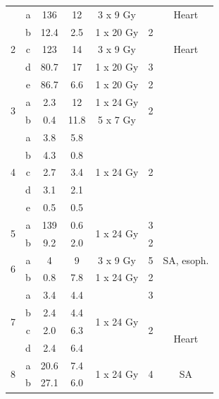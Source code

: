 \documentclass[type=dr, dr=rernat, accentcolor=tud7b,colorbacktitle, bigchapter, openright, twoside, 12pt ]{tudthesis}
\begin{document}
\begin{table}[H]
\begin{tabular}{c|c|c|c|c|c|c}
		 \hline
		 \multirow{5}{*}{2} & a & 136 & 12  & 3 x 9 Gy & \multirow{3}{*}{2} & Heart\\
		  & b & 12.4 & 2.5  & 1 x 20 Gy &  &\\
		  & c & 123 & 14  & 3 x 9 Gy &  &Heart \\
		 & d & 80.7 & 17  & 1 x 20 Gy & 3  &\\
		 & e & 86.7 & 6.6  & 1 x 20 Gy & 2 & \\
		 \hline
		 \multirow{2}{*}{3} & a & 2.3 & 12  & 1 x 24 Gy & \multirow{2}{*}{2} \\
		 & b & 0.4 & 11.8  & 5 x 7 Gy &  \\
		 \hline
		 \multirow{5}{*}{4} & a & 3.8 & 5.8  & \multirow{5}{*}{1 x 24 Gy} & \multirow{5}{*}{2} \\
		  & b & 4.3 & 0.8  &  & \\
		  & c & 2.7 & 3.4  &  & \\
		  & d & 3.1 & 2.1  &  & \\
		  & e & 0.5 & 0.5  &  & \\
		  \hline
		  \multirow{2}{*}{5} & a & 139 & 0.6 & \multirow{2}{*}{1 x 24 Gy} & 3 \\
		 & b & 9.2 & 2.0  &  & 2 \\
		 \hline
		 \multirow{2}{*}{6} & a & 4 & 9  & 3 x 9 Gy  & 5 & SA, esoph. \\
		 & b & 0.8 & 7.8  & 1 x 24 Gy & 2 \\
		 \hline
		 \multirow{4}{*}{7} & a & 3.4   & 4.4    & \multirow{4}{*}{1 x 24 Gy} & 3  \\
				    & b & 2.4 & 4.4  & & \multirow{3}{*}{2} \\
				    & c & 2.0 & 6.3  & & & \multirow{2}{*}{Heart}\\
				    & d & 2.4 & 6.4  & & \\
		\hline	    
		\multirow{2}{*}{8} & a & 20.6 & 7.4 & \multirow{2}{*}{1 x 24 Gy} & \multirow{2}{*}{4} & \multirow{2}{*}{SA}  \\
		 & b & 27.1 & 6.0  &  &   \\
		 

\end{tabular}
\end{table}
\end{document}
